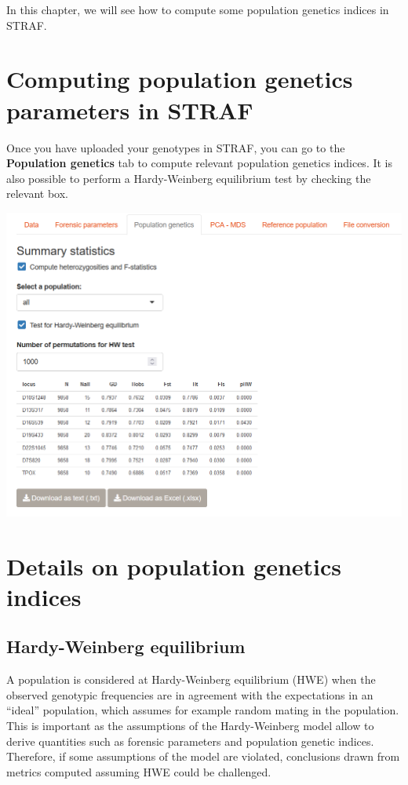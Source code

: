 \documentclass[
]{book}
\begin{document}
In this chapter, we will see how to compute some population genetics indices in STRAF.

\hypertarget{computing-population-genetics-parameters-in-straf}{%
\section{Computing population genetics parameters in STRAF}\label{computing-population-genetics-parameters-in-straf}}

Once you have uploaded your genotypes in STRAF, you can go to the \textbf{Population genetics}
tab to compute relevant population genetics indices. It is also possible to perform
a Hardy-Weinberg equilibrium test by checking the relevant box.

\includegraphics[width=1\linewidth]{img/capture_popgen_parameters_1}

\hypertarget{details-on-population-genetics-indices}{%
\section{Details on population genetics indices}\label{details-on-population-genetics-indices}}

\hypertarget{hardy-weinberg-equilibrium}{%
\subsection{Hardy-Weinberg equilibrium}\label{hardy-weinberg-equilibrium}}

A population is considered at Hardy-Weinberg equilibrium (HWE) when the observed
genotypic frequencies are in agreement with the expectations in an ``ideal'' population,
which assumes for example random mating in the population.
This is important as the assumptions of the Hardy-Weinberg model
allow to derive quantities such as forensic parameters and population genetic indices.
Therefore, if some assumptions of the model are violated, conclusions drawn from
metrics computed assuming HWE could be challenged.
\end{document}
